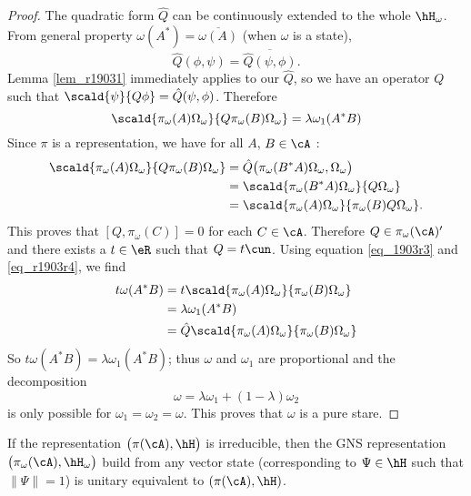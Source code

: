 \begin{proof}
The quadratic form $\hat Q$ can be continuously extended to the whole $\hH_{\omega}$. From general property $\omega(A^*)=\overline{ \omega(A) }$ (when $\omega$ is a state),
\[ 
  \hat Q(\phi,\psi)=\overline{ \hat Q(\psi,\phi) }.
\]
Lemma \ref{lem_r19031} immediately applies to our $\hat Q$, so we have an operator $Q$ such that $\scald{ \psi }{ Q\phi }=\hat Q(\psi,\phi)$. Therefore
%
\begin{equation} \label{eq_1903r3}
  \scald{ \pi_{\omega}(A)\Omega_{\omega}}{Q\pi_{\omega}(B)\Omega_{\omega}}=\lambda\omega_1(A^*B)
\end{equation}
Since $\pi$ is a representation, we have for all $A$, $B\in\cA$ :
 \begin{equation}
\begin{split}
  \scald{ \pi_{\omega}(A)\Omega_{\omega} }{ Q\pi_{\omega}(B)\Omega_{\omega} }
     &=\hat Q\big( \pi_{\omega}(B^*A)\Omega_{\omega},\Omega_{\omega} \big)\\
        &=\scald{ \pi_{\omega}(B^*A)\Omega_{\omega} }{ Q\Omega_{\omega} }\\
        &=\scald{ \pi_{\omega}(A)\Omega_{\omega} }{ \pi_{\omega}(B)Q\Omega_{\omega} }.
\end{split}
\end{equation}
This proves that $[Q,\pi_{\omega}(C)]=0$ for each $C\in\cA$. Therefore $Q\in\pi_{\omega}(\cA)'$ and there exists a $t\in\eR$ such that $Q=t\cun$. Using equation \eqref{eq_1903r3} and  \eqref{eq_r1903r4}, we find 
%
\begin{equation}
\begin{split}
t\omega(A^*B)&=t\scald{ \pi_{\omega}(A)\Omega_{\omega} }{ \pi_{\omega}(B)\Omega_{\omega} }\\
&=\lambda\omega_1(A^*B)\\
&=\hat Q\scald{ \pi_{\omega}(A)\Omega_{\omega} }{ \pi_{\omega}(B)\Omega_{\omega} }\\
\end{split}
\end{equation}
So $t\omega(A^*B)=\lambda\omega_1(A^*B)$; thus $\omega$ and $\omega_1$ are proportional and the decomposition
%
\[ 
  \omega=\lambda\omega_1+(1-\lambda)\omega_2
\]
is only possible for $\omega_1=\omega_2=\omega$. This proves that $\omega$ is a pure stare.

\end{proof}


\begin{corollary}
If the representation $\big( \pi(\cA),\hH \big)$ is irreducible, then the GNS representation $\big( \pi_{\omega}(\cA),\hH_{\omega} \big)$ build from any vector state (corresponding to $\Psi\in\hH$ such that $\| \Psi \|=1$) is unitary equivalent to $(\pi(\cA),\hH)$.
 \label{cor_GNSirredst}
\end{corollary}

